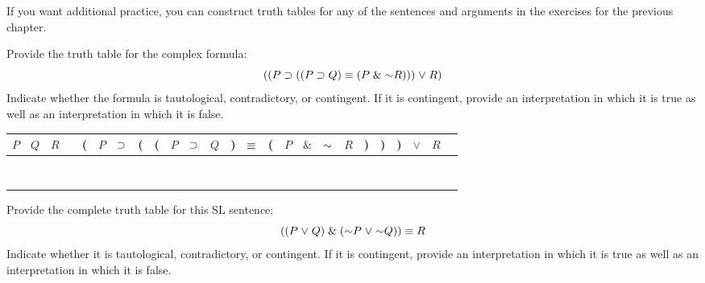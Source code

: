 \iffalse

\practiceproblems
If you want additional practice, you can construct truth tables for any of the sentences and arguments in the exercises for the previous chapter.



\problempart
\label{HW2.E}
Provide the truth table for the complex formula:
$$((P \eif (( P \eif Q) \eiff (P \eand \enot R))) \eor R)$$
Indicate whether the formula is tautological, contradictory, or contingent.
If it is contingent, provide an interpretation in which it is true as well as an interpretation in which it is false.


\begin{tabular}{@{ }c@{ }@{ }c@{ }@{ }c | c@{ }@{}c@{}@{ }c@{ }@{ }c@{ }@{}c@{}@{}c@{}@{ }c@{ }@{ }c@{ }@{ }c@{ }@{}c@{}@{ }c@{ }@{}c@{}@{ }c@{ }@{ }c@{ }@{ }c@{ }@{ }c@{ }@{}c@{}@{}c@{}@{}c@{}@{ }c@{ }@{ }c@{ }@{ }c}
$P$ & $Q$ & $R$ &  & ( & $P$ & $\supset $ & ( & ( & $P$ & $\supset $ & $Q$ & ) & $\equiv $ & ( & $P$ & $\&$ & $\enot$ & $R$ & ) & ) & ) & $\lor$ & $R$ & \\
\hline 
 &  &  &  &  &  &  &  &  &  &  &  &  &  &  &  &  &  &  &  &  &  &  & & \\
 &  &  &  &  &  &  &  &  &  &  &  &  &  &  &  &  &  &  &  &  &  &  & & \\
  &  &  &  &  &  &  &  &  &  &  &  &  &  &  &  &  &  &  &  &  &  &  & & \\
 &  &  &  &  &  &  &  &  &  &  &  &  &  &  &  &  &  &  &  &  &  &  & & \\
 &  &  &  &  &  &  &  &  &  &  &  &  &  &  &  &  &  &  &  &  &  &  & & \\
  &  &  &  &  &  &  &  &  &  &  &  &  &  &  &  &  &  &  &  &  &  &  & & \\
 &  &  &  &  &  &  &  &  &  &  &  &  &  &  &  &  &  &  &  &  &  &  & & \\
  &  &  &  &  &  &  &  &  &  &  &  &  &  &  &  &  &  &  &  &  &  &  & & \\
\end{tabular}




\problempart
\label{HW3.A}
Provide the complete truth table for this SL sentence:
$$((P \eor Q) \eand (\enot P \eor \enot Q)) \eiff R$$
Indicate whether it is tautological, contradictory, or contingent. 
If it is contingent, provide an interpretation in which it is true as well as an interpretation in which it is false.



